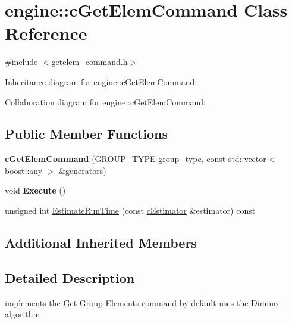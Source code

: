 \hypertarget{classengine_1_1cGetElemCommand}{\section{engine\-:\-:c\-Get\-Elem\-Command Class Reference}
\label{classengine_1_1cGetElemCommand}
}


{\ttfamily \#include $<$getelem\-\_\-command.\-h$>$}



Inheritance diagram for engine\-:\-:c\-Get\-Elem\-Command\-:


Collaboration diagram for engine\-:\-:c\-Get\-Elem\-Command\-:
\subsection*{Public Member Functions}
\begin{DoxyCompactItemize}
\item 
\hypertarget{classengine_1_1cGetElemCommand_ad7a89645b195be08ff2562ccbde22e6c}{{\bfseries c\-Get\-Elem\-Command} (G\-R\-O\-U\-P\-\_\-\-T\-Y\-P\-E group\-\_\-type, const std\-::vector$<$ boost\-::any $>$ \&generators)}\label{classengine_1_1cGetElemCommand_ad7a89645b195be08ff2562ccbde22e6c}

\item 
\hypertarget{classengine_1_1cGetElemCommand_a16a627c20d55b3f2538bab7f63a04a04}{void {\bfseries Execute} ()}\label{classengine_1_1cGetElemCommand_a16a627c20d55b3f2538bab7f63a04a04}

\item 
unsigned int \hyperlink{classengine_1_1cGetElemCommand_ad84c73fe5b4db65679f28c427d201434}{Estimate\-Run\-Time} (const \hyperlink{classengine_1_1cEstimator}{c\-Estimator} \&estimator) const 
\end{DoxyCompactItemize}
\subsection*{Additional Inherited Members}


\subsection{Detailed Description}
implements the Get Group Elements command by default uses the Dimino algorithm 

